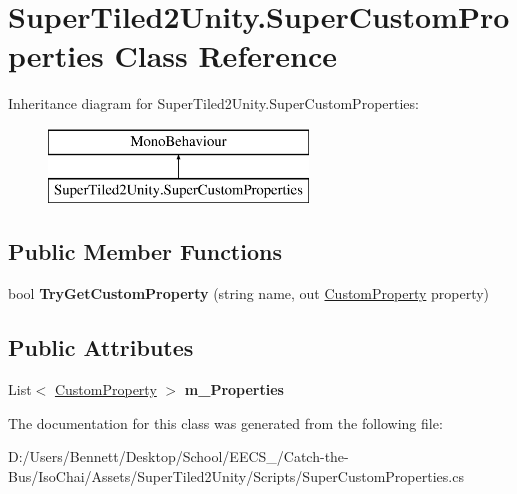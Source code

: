 \hypertarget{class_super_tiled2_unity_1_1_super_custom_properties}{}\section{Super\+Tiled2\+Unity.\+Super\+Custom\+Properties Class Reference}
\label{class_super_tiled2_unity_1_1_super_custom_properties}
Inheritance diagram for Super\+Tiled2\+Unity.\+Super\+Custom\+Properties\+:\begin{figure}[H]
\begin{center}
\leavevmode
\includegraphics[height=2.000000cm]{class_super_tiled2_unity_1_1_super_custom_properties}
\end{center}
\end{figure}
\subsection*{Public Member Functions}
\begin{DoxyCompactItemize}
\item 
\mbox{\label{class_super_tiled2_unity_1_1_super_custom_properties_a9e0294cb438b12984497bbe32fd5d134}} 
bool {\bfseries Try\+Get\+Custom\+Property} (string name, out \mbox{\hyperlink{class_super_tiled2_unity_1_1_custom_property}{Custom\+Property}} property)
\end{DoxyCompactItemize}
\subsection*{Public Attributes}
\begin{DoxyCompactItemize}
\item 
\mbox{\label{class_super_tiled2_unity_1_1_super_custom_properties_ac35aa95fbbc66771d5a753529d4e36fb}} 
List$<$ \mbox{\hyperlink{class_super_tiled2_unity_1_1_custom_property}{Custom\+Property}} $>$ {\bfseries m\+\_\+\+Properties}
\end{DoxyCompactItemize}


The documentation for this class was generated from the following file\+:\begin{DoxyCompactItemize}
\item 
D\+:/\+Users/\+Bennett/\+Desktop/\+School/\+E\+E\+C\+S\+\_/\+Catch-\/the-\/\+Bus/\+Iso\+Chai/\+Assets/\+Super\+Tiled2\+Unity/\+Scripts/Super\+Custom\+Properties.\+cs\end{DoxyCompactItemize}

